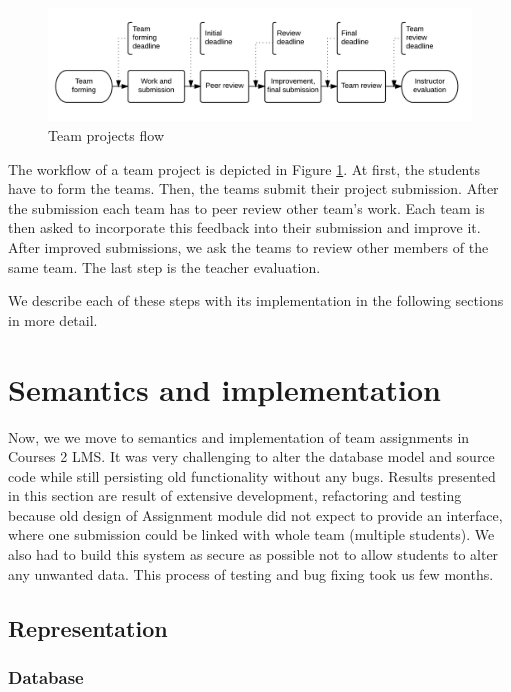\begin{figure}[h]
    \centering
    \includegraphics[width=\textwidth]{images/teammap.png}
    \caption{Team projects flow}
    \label{fig:teammap}
\end{figure}

The workflow of a team project is depicted in Figure \ref{fig:teammap}. At first, the students have to form the teams. Then, the teams submit their project submission. After the submission each team has to peer review other team's work. Each team is then asked to incorporate this feedback into their submission and improve it. After improved submissions, we ask the teams to review other members of the same team. The last step is the teacher evaluation. 

We describe each of these steps with its implementation in the following sections in more detail. 

\section{Semantics and implementation}
Now, we we move to semantics and implementation of team assignments in Courses 2 LMS. It was very challenging to alter the database model and source code while still persisting old functionality without any bugs. Results presented in this section are result of extensive development, refactoring and testing because old design of Assignment module did not expect to provide an interface, where one submission could be linked with whole team (multiple students). We also had to build this system as secure as possible not to allow students to alter any unwanted data. This process of testing and bug fixing took us few months.

\subsection{Representation}

\subsubsection{Database}


